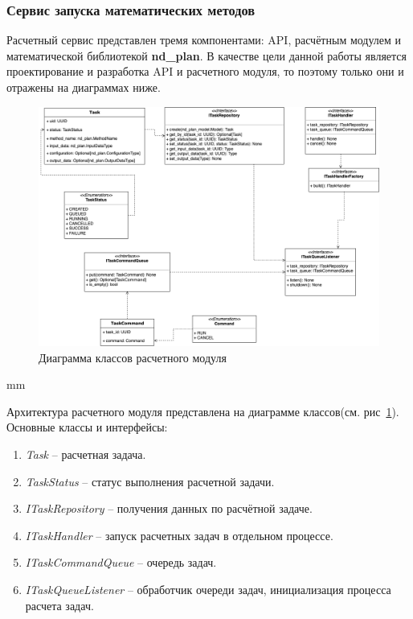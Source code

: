\subsubsection{\large{Сервис запуска математических методов}}

Расчетный сервис представлен тремя компонентами: API, расчётным модулем и математической библиотекой \textbf{nd\_plan}.
В качестве цели данной работы является проектирование и разработка API и расчетного модуля,
то поэтому только они и отражены на диаграммах ниже.

\begin{figure}[H]
	\hspace*{-2.5 cm}\includegraphics[width=1.2\textwidth]{architecture/pictures/executor/execution_classes_diagram}
	\caption{Диаграмма классов расчетного модуля}
	\label{pic:architecture__execution-classes-diagram}
\end{figure}
 mm

Архитектура расчетного модуля представлена на диаграмме классов(см. рис\ \ref{pic:architecture__execution-classes-diagram}).
Основные классы и интерфейсы:
\begin{enumerate}
	\item \textit{Task} -- расчетная задача.
	\item \textit{TaskStatus} -- статус выполнения расчетной задачи.
	\item \textit{ITaskRepository} -- получения данных по расчётной задаче.
	\item \textit{ITaskHandler} -- запуск расчетных задач в отдельном процессе.
	\item \textit{ITaskCommandQueue} -- очередь задач.
	\item \textit{ITaskQueueListener} -- обработчик очереди задач, инициализация процесса расчета задач.
\end{enumerate}


